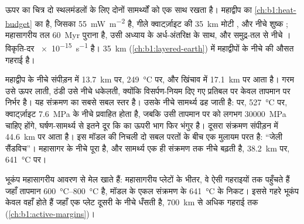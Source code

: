 \begin{omfigure}
\label{fig:b1:stress-strain-rheology:envelope}
\end{omfigure}

ऊपर का चित्र दो स्थलमंडलों के लिए दोनों सामर्थ्यों को एक साथ रखता है। महाद्वीप का \cref{ch:b1:heat-budget} का  है, जिसका  \qty{55}{mW.m^{-2}} है, गीले क्वार्ट्ज़ाइट की \qty{35}{km} मोटी , और नीचे शुष्क ; महासागरीय तल \qty{60}{Myr} पुराना है, उसी अध्याय के अर्ध-अंतरिक्ष  के साथ, और समुद्र-तल से नीचे । विकृति-दर \qty{e-15}{s^{-1}} है। \qty{35}{km}  (\cref{ch:b1:layered-earth}) में महाद्वीपों के नीचे  की औसत गहराई है।

महाद्वीप के नीचे  संपीड़न में \qty{13.7}{km} पर, \qty{249}{\degreeCelsius} पर, और खिंचाव में \qty{17.1}{km} पर आता है। गरम  उसे ऊपर लाती, ठंडी उसे नीचे धकेलती, क्योंकि विसर्पण-नियम दिए गए प्रतिबल पर केवल तापमान पर निर्भर है। यह संक्रमण  का सबसे सबल स्तर है। उसके नीचे सामर्थ्य ढह जाती है:  पर, \qty{527}{\degreeCelsius} पर, क्वार्ट्ज़ाइट \qty{7.6}{MPa} के नीचे प्रवाहित होता है, जबकि उसी तापमान पर  को लगभग \qty{30000}{MPa} चाहिए होंगे, घर्षण-सामर्थ्य से इतने दूर कि  का ऊपरी भाग फिर भंगुर है। दूसरा संक्रमण संपीड़न में \qty{44.6}{km} पर आता है। इस मॉडल की निचली  दो सबल परतों के बीच एक मुलायम परत है: ``जेली सैंडविच''। महासागर के नीचे पूरा   है, और सामर्थ्य एक ही संक्रमण तक नीचे बढ़ती है, \qty{38.2}{km} पर, \qty{641}{\degreeCelsius} पर।

भूकंप महासागरीय आवरण से मेल खाते हैं: महासागरीय प्लेटों के भीतर, वे ऐसी गहराइयों तक पहुँचते हैं जहाँ तापमान \qtyrange{600}{800}{\degreeCelsius} है, मॉडल के एकल संक्रमण के \qty{641}{\degreeCelsius} के निकट। इससे गहरे भूकंप केवल वहाँ होते हैं जहाँ एक प्लेट दूसरी के नीचे धँसती है, \qty{700}{km} से अधिक गहराई तक (\cref{ch:b1:active-margins})।


